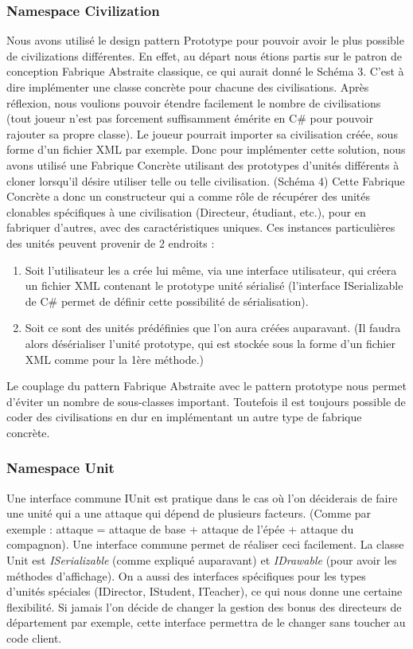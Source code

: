 		\subsubsection{Namespace Civilization}
			Nous avons utilisé le design pattern Prototype pour pouvoir avoir le plus possible de civilizations différentes.
		En effet, au départ nous étions partis sur le patron de conception Fabrique Abstraite classique, ce qui aurait donné le Schéma 3. C'est à dire implémenter une classe concrète pour chacune des civilisations.
			Après réflexion, nous voulions pouvoir étendre facilement le nombre de civilisations (tout joueur n'est pas forcement suffisamment émérite en C\# pour pouvoir rajouter sa propre classe).
		Le joueur pourrait importer sa civilisation créée, sous forme d'un fichier XML par exemple. 
		Donc pour implémenter cette solution, nous avons utilisé une Fabrique Concrète utilisant des prototypes d'unités différents à cloner lorsqu'il désire utiliser telle ou telle civilisation. (Schéma 4)
		Cette Fabrique Concrète a donc un constructeur qui a comme rôle de récupérer des unités clonables spécifiques à une civilisation (Directeur, étudiant, etc.), pour en fabriquer d'autres, avec des caractéristiques uniques.
Ces instances particulières des unités peuvent provenir de 2 endroits :
\begin{enumerate}
\item Soit l'utilisateur les a crée lui même, via une interface utilisateur, qui créera un fichier XML contenant le prototype unité sérialisé (l'interface ISerializable de C\# permet de définir cette possibilité de sérialisation).
\item Soit ce sont des unités prédéfinies que l'on aura créées auparavant. (Il faudra alors désérialiser l'unité prototype, qui est stockée sous la forme d'un fichier XML comme pour la 1ère méthode.)
\end{enumerate}
		Le couplage du pattern Fabrique Abstraite avec le pattern prototype nous permet d'éviter un nombre de sous-classes important. Toutefois il est toujours possible de coder des civilisations en dur en implémentant un autre type de fabrique concrète.

		
		\subsubsection{Namespace Unit}
			Une interface commune IUnit est pratique dans le cas où l'on déciderais de faire une unité qui a une attaque qui dépend de plusieurs facteurs.
		(Comme par exemple : attaque = attaque de base + attaque de l'épée + attaque du compagnon). Une interface commune permet de réaliser ceci facilement.
			La classe Unit est \textit{ISerializable} (comme expliqué auparavant) et \textit{IDrawable} (pour avoir les méthodes d'affichage).
		On a aussi des interfaces spécifiques pour les types d'unités spéciales (IDirector, IStudent, ITeacher), ce qui nous donne une certaine flexibilité.
			Si jamais l'on décide de changer la gestion des bonus des directeurs de département par exemple, cette interface permettra de le changer sans toucher au code client.
		
